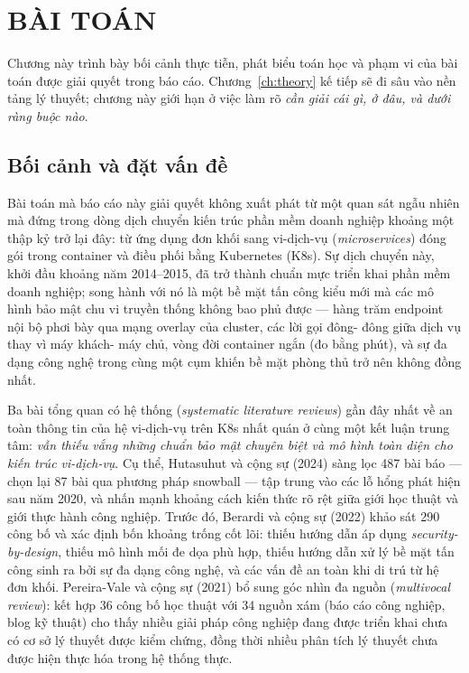 
\chapter{BÀI TOÁN}
\label{ch:problem}

Chương này trình bày bối cảnh thực tiễn, phát biểu toán học và phạm vi của bài toán được giải quyết trong báo cáo. Chương~\ref{ch:theory} kế tiếp sẽ đi sâu vào nền tảng lý thuyết; chương này giới hạn ở việc làm rõ \textit{cần giải cái gì, ở đâu, và dưới ràng buộc nào}.

\section{Bối cảnh và đặt vấn đề}
\label{sec:context-problem}

Bài toán mà báo cáo này giải quyết không xuất phát từ một quan sát ngẫu nhiên mà đứng trong dòng dịch chuyển kiến trúc phần mềm doanh nghiệp khoảng một thập kỷ trở lại đây: từ ứng dụng đơn khối sang vi-dịch-vụ (\textit{microservices}) đóng gói trong container và điều phối bằng Kubernetes (K8s). Sự dịch chuyển này, khởi đầu khoảng năm 2014--2015, đã trở thành chuẩn mực triển khai phần mềm doanh nghiệp; song hành với nó là một bề mặt tấn công kiểu mới mà các mô hình bảo mật chu vi truyền thống không bao phủ được --- hàng trăm endpoint nội bộ phơi bày qua mạng overlay của cluster, các lời gọi đông\nobreakdash- đông giữa dịch vụ thay vì máy khách\nobreakdash- máy chủ, vòng đời container ngắn (đo bằng phút), và sự đa dạng công nghệ trong cùng một cụm khiến bề mặt phòng thủ trở nên không đồng nhất.

Ba bài tổng quan có hệ thống (\textit{systematic literature reviews}) gần đây nhất về an toàn thông tin của hệ vi-dịch-vụ trên K8s nhất quán ở cùng một kết luận trung tâm: \textit{vẫn thiếu vắng những chuẩn bảo mật chuyên biệt và mô hình toàn diện cho kiến trúc vi-dịch-vụ}. Cụ thể, Hutasuhut và cộng sự (2024) \cite{hutasuhut2024gap} sàng lọc 487 bài báo --- chọn lại 87 bài qua phương pháp snowball --- tập trung vào các lỗ hổng phát hiện sau năm 2020, và nhấn mạnh khoảng cách kiến thức rõ rệt giữa giới học thuật và giới thực hành công nghiệp. Trước đó, Berardi và cộng sự (2022) \cite{berardi2022microservice} khảo sát 290 công bố và xác định bốn khoảng trống cốt lõi: thiếu hướng dẫn áp dụng \textit{security-by-design}, thiếu mô hình mối đe dọa phù hợp, thiếu hướng dẫn xử lý bề mặt tấn công sinh ra bởi sự đa dạng công nghệ, và các vấn đề an toàn khi di trú từ hệ đơn khối. Pereira-Vale và cộng sự (2021) \cite{pereiravale2021security} bổ sung góc nhìn đa nguồn (\textit{multivocal review}): kết hợp 36 công bố học thuật với 34 nguồn xám (báo cáo công nghiệp, blog kỹ thuật) cho thấy nhiều giải pháp công nghiệp đang được triển khai chưa có cơ sở lý thuyết được kiểm chứng, đồng thời nhiều phân tích lý thuyết chưa được hiện thực hóa trong hệ thống thực.

